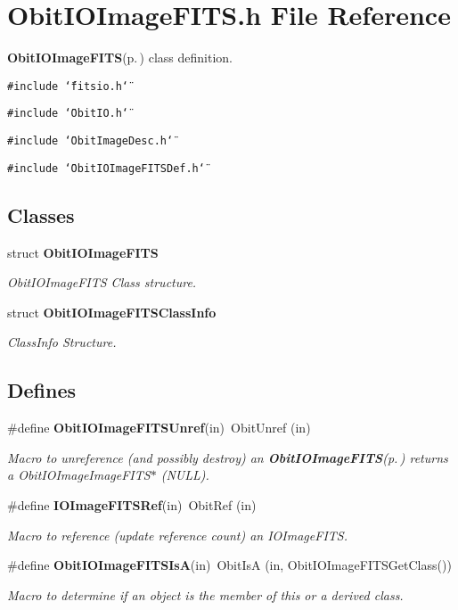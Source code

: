 \section{Obit\-IOImage\-FITS.h File Reference}
\label{ObitIOImageFITS_8h}
{\bf Obit\-IOImage\-FITS}{\rm (p.\,\pageref{structObitIOImageFITS})} class definition. 

{\tt \#include \char`\"{}fitsio.h\char`\"{}}\par
{\tt \#include \char`\"{}Obit\-IO.h\char`\"{}}\par
{\tt \#include \char`\"{}Obit\-Image\-Desc.h\char`\"{}}\par
{\tt \#include \char`\"{}Obit\-IOImage\-FITSDef.h\char`\"{}}\par
\subsection*{Classes}
\begin{CompactItemize}
\item 
struct {\bf Obit\-IOImage\-FITS}
\begin{CompactList}\small\item\em Obit\-IOImage\-FITS Class structure. \item\end{CompactList}\item 
struct {\bf Obit\-IOImage\-FITSClass\-Info}
\begin{CompactList}\small\item\em Class\-Info Structure. \item\end{CompactList}\end{CompactItemize}
\subsection*{Defines}
\begin{CompactItemize}
\item 
\#define {\bf Obit\-IOImage\-FITSUnref}(in)\ Obit\-Unref (in)
\begin{CompactList}\small\item\em Macro to unreference (and possibly destroy) an {\bf Obit\-IOImage\-FITS}{\rm (p.\,\pageref{structObitIOImageFITS})} returns a Obit\-IOImage\-Image\-FITS$\ast$ (NULL). \item\end{CompactList}\item 
\#define {\bf IOImage\-FITSRef}(in)\ Obit\-Ref (in)
\begin{CompactList}\small\item\em Macro to reference (update reference count) an IOImage\-FITS. \item\end{CompactList}\item 
\#define {\bf Obit\-IOImage\-FITSIs\-A}(in)\ Obit\-Is\-A (in, Obit\-IOImage\-FITSGet\-Class())
\begin{CompactList}\small\item\em Macro to determine if an object is the member of this or a derived class. \item\end{CompactList}\end{CompactItemize}
